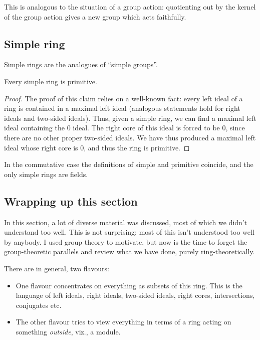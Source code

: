 \documentclass[a4paper]{amsart}
\begin{document}
This is analogous to the situation of a group action: quotienting out
by the kernel of the group action gives a new group which acts
faithfully.

\subsection{Simple ring}

\begin{definer}
\end{definer}

Simple rings are the analogues of ``simple groups''.

\begin{claimer}
  Every simple ring is primitive.
\end{claimer}

\begin{proof}
  The proof of this claim relies on a well-known fact: every left
  ideal of a ring is contained in a maximal left ideal (analogous
  statements hold for right ideals and two-sided ideals). Thus, given
  a simple ring, we can find a maximal left ideal containing the $0$
  ideal. The right core of this ideal is forced to be $0$, since there
  are no other proper two-sided ideals. We have thus produced a
  maximal left ideal whose right core is $0$, and thus the ring is
  primitive.
\end{proof}

In the commutative case the definitions of simple and primitive coincide,
and the only simple rings are fields.

\subsection{Wrapping up this section}

In this section, a lot of diverse material was discussed, most of
which we didn't understand too well. This is not surprising: most of
this isn't understood too well by anybody. I used group theory to
motivate, but now is the time to forget the group-theoretic parallels
and review what we have done, purely ring-theoretically.

There are in general, two flavours:

\begin{itemize}

\item One flavour concentrates on everything as subsets of this
  ring. This is the language of left ideals, right ideals, two-sided
  ideals, right cores, intersections, conjugates etc.

\item The other flavour tries to view everything in terms of a ring
  acting on something {\em outside}, viz., a module.

\end{itemize}
\end{document}
